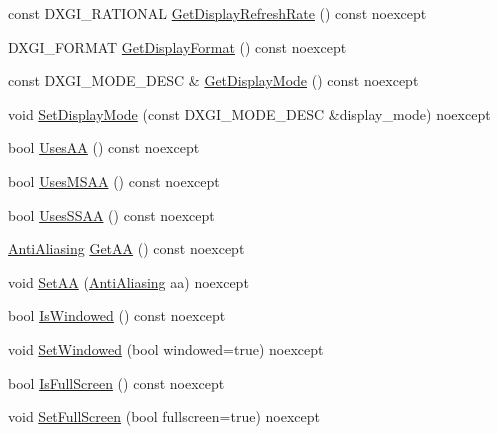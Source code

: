 \begin{DoxyCompactItemize}
\item 
const D\+X\+G\+I\+\_\+\+R\+A\+T\+I\+O\+N\+AL \hyperlink{classmage_1_1rendering_1_1_display_configuration_ae100fc84cd1900e302fb784f429a06b7}{Get\+Display\+Refresh\+Rate} () const noexcept
\item 
D\+X\+G\+I\+\_\+\+F\+O\+R\+M\+AT \hyperlink{classmage_1_1rendering_1_1_display_configuration_a66c6757aa4c17227ab0e7022228f982a}{Get\+Display\+Format} () const noexcept
\item 
const D\+X\+G\+I\+\_\+\+M\+O\+D\+E\+\_\+\+D\+E\+SC \& \hyperlink{classmage_1_1rendering_1_1_display_configuration_af3cd8d29b8f6d6bc0fa1579260badf99}{Get\+Display\+Mode} () const noexcept
\item 
void \hyperlink{classmage_1_1rendering_1_1_display_configuration_a7cc6b9dcf3932a62bfd1416fc7b397ea}{Set\+Display\+Mode} (const D\+X\+G\+I\+\_\+\+M\+O\+D\+E\+\_\+\+D\+E\+SC \&display\+\_\+mode) noexcept
\item 
bool \hyperlink{classmage_1_1rendering_1_1_display_configuration_abbcb68e66c4a659cb169819a4f1d0d5d}{Uses\+AA} () const noexcept
\item 
bool \hyperlink{classmage_1_1rendering_1_1_display_configuration_a1cd8c25ade06ad47945ca0046e350749}{Uses\+M\+S\+AA} () const noexcept
\item 
bool \hyperlink{classmage_1_1rendering_1_1_display_configuration_ad233d7838a302fa0ce73cf06b1660404}{Uses\+S\+S\+AA} () const noexcept
\item 
\hyperlink{namespacemage_1_1rendering_ac3f75e49e92b42f2f5fb55c450d8899c}{Anti\+Aliasing} \hyperlink{classmage_1_1rendering_1_1_display_configuration_a243b2a170b97a9583f76a8f16aee5ba6}{Get\+AA} () const noexcept
\item 
void \hyperlink{classmage_1_1rendering_1_1_display_configuration_a8cb3173220d7405353fa4d1726e7063d}{Set\+AA} (\hyperlink{namespacemage_1_1rendering_ac3f75e49e92b42f2f5fb55c450d8899c}{Anti\+Aliasing} aa) noexcept
\item 
bool \hyperlink{classmage_1_1rendering_1_1_display_configuration_acbe793e625311707e234fcd0977978d5}{Is\+Windowed} () const noexcept
\item 
void \hyperlink{classmage_1_1rendering_1_1_display_configuration_a78d0902979bd5a0eff7fef0aa7976a7f}{Set\+Windowed} (bool windowed=true) noexcept
\item 
bool \hyperlink{classmage_1_1rendering_1_1_display_configuration_a507e755923af2ba1338cc041b5df8e0a}{Is\+Full\+Screen} () const noexcept
\item 
void \hyperlink{classmage_1_1rendering_1_1_display_configuration_a5e15cc1ca56718a7892b80cd0a1d20c0}{Set\+Full\+Screen} (bool fullscreen=true) noexcept

\end{DoxyCompactItemize}
